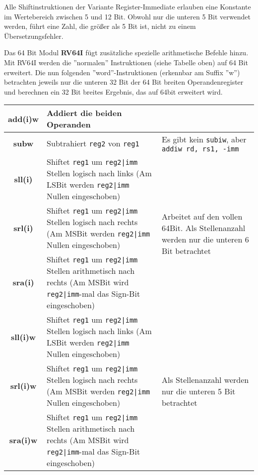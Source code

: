 \begin{warningblock}
	Alle Shiftinstruktionen der Variante Register-Immediate erlauben eine Konstante im Wertebereich zwischen 5 und 12 Bit. Obwohl nur die unteren 5 Bit verwendet werden, führt eine Zahl, die größer als 5 Bit ist, nicht zu einem Übersetzungsfehler.
\end{warningblock}
Das 64 Bit Modul \textbf{RV64I} fügt zusätzliche spezielle arithmetische Befehle hinzu. Mit RV64I werden die ''normalen'' Instruktionen (siehe Tabelle oben) auf 64 Bit erweitert. Die nun folgenden ''word''-Instruktionen (erkennbar am Suffix ''w'') betrachten jeweils nur die unteren 32 Bit der 64 Bit breiten Operandenregister und berechnen ein 32 Bit breites Ergebnis, das auf 64bit erweitert wird.
\begin{tabular}{|c|p{8cm}|p{4cm}|}
	\hline
	\textbf{add(i)w} & Addiert die beiden Operanden & \\
	\hline
	\textbf{subw} & Subtrahiert \texttt{reg2} von \texttt{reg1}& Es gibt kein \texttt{subiw}, aber \texttt{addiw rd, rs1, -imm} \\
	\hline
	\textbf{sll(i)} & Shiftet \texttt{reg1} um \texttt{reg2|imm} Stellen logisch nach links (Am LSBit werden \texttt{reg2|imm} Nullen eingeschoben) & \multirow{3}{4cm}{Arbeitet auf den vollen 64Bit. Als Stellenanzahl werden nur die unteren 6 Bit betrachtet} \\
	\cline{1-2}
	\textbf{srl(i)} & Shiftet \texttt{reg1} um \texttt{reg2|imm} Stellen logisch nach rechts (Am MSBit werden \texttt{reg2|imm} Nullen eingeschoben) & \\
	\cline{1-2}
	\textbf{sra(i)} & Shiftet \texttt{reg1} um \texttt{reg2|imm} Stellen arithmetisch nach rechts (Am MSBit wird \texttt{reg2|imm}-mal das Sign-Bit eingeschoben) & \\
	\hline
	\textbf{sll(i)w} & Shiftet \texttt{reg1} um \texttt{reg2|imm} Stellen logisch nach links (Am LSBit werden \texttt{reg2|imm} Nullen eingeschoben) & \multirow{3}{4cm}{Als Stellenanzahl werden nur die unteren 5 Bit betrachtet} \\
	\cline{1-2}
	\textbf{srl(i)w} & Shiftet \texttt{reg1} um \texttt{reg2|imm} Stellen logisch nach rechts (Am MSBit werden \texttt{reg2|imm} Nullen eingeschoben) & \\
	\cline{1-2}
	\textbf{sra(i)w} & Shiftet \texttt{reg1} um \texttt{reg2|imm} Stellen arithmetisch nach rechts (Am MSBit wird \texttt{reg2|imm}-mal das Sign-Bit eingeschoben) & \\
	\hline
\end{tabular}

